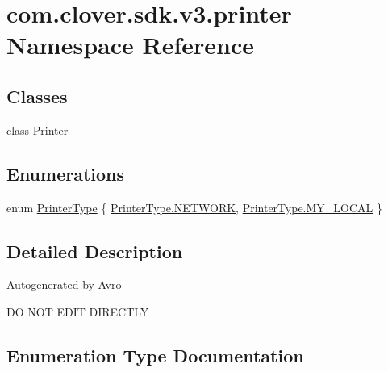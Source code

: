 \hypertarget{namespacecom_1_1clover_1_1sdk_1_1v3_1_1printer}{}\section{com.\+clover.\+sdk.\+v3.\+printer Namespace Reference}
\label{namespacecom_1_1clover_1_1sdk_1_1v3_1_1printer}
\subsection*{Classes}
\begin{DoxyCompactItemize}
\item 
class \hyperlink{classcom_1_1clover_1_1sdk_1_1v3_1_1printer_1_1_printer}{Printer}
\end{DoxyCompactItemize}
\subsection*{Enumerations}
\begin{DoxyCompactItemize}
\item 
enum \hyperlink{namespacecom_1_1clover_1_1sdk_1_1v3_1_1printer_aaa495f52394f8a733ba9bb4650cb1583}{Printer\+Type} \{ \hyperlink{namespacecom_1_1clover_1_1sdk_1_1v3_1_1printer_aaa495f52394f8a733ba9bb4650cb1583a25835188a2355e9530d3a10fcbe4c65b}{Printer\+Type.\+N\+E\+T\+W\+O\+RK}, 
\hyperlink{namespacecom_1_1clover_1_1sdk_1_1v3_1_1printer_aaa495f52394f8a733ba9bb4650cb1583a6a5593506c0219b5f46903552e4bc229}{Printer\+Type.\+M\+Y\+\_\+\+L\+O\+C\+AL}
 \}
\end{DoxyCompactItemize}


\subsection{Detailed Description}
Autogenerated by Avro

DO N\+OT E\+D\+IT D\+I\+R\+E\+C\+T\+LY 

\subsection{Enumeration Type Documentation}
\mbox{\label{namespacecom_1_1clover_1_1sdk_1_1v3_1_1printer_aaa495f52394f8a733ba9bb4650cb1583}} 
